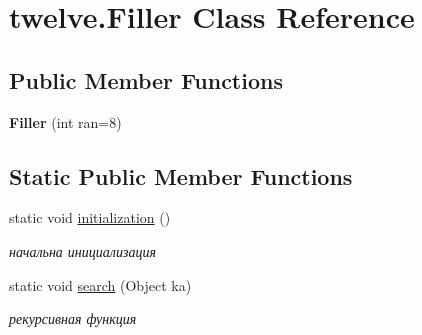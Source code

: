 \hypertarget{classtwelve_1_1_filler}{}\section{twelve.\+Filler Class Reference}
\label{classtwelve_1_1_filler}
\subsection*{Public Member Functions}
\begin{DoxyCompactItemize}
\item 
\hypertarget{classtwelve_1_1_filler_a64d6fd1ae798024fed8fa2e7c7eca9b6}{}{\bfseries Filler} (int ran=8)\label{classtwelve_1_1_filler_a64d6fd1ae798024fed8fa2e7c7eca9b6}

\end{DoxyCompactItemize}
\subsection*{Static Public Member Functions}
\begin{DoxyCompactItemize}
\item 
static void \hyperlink{classtwelve_1_1_filler_a8db08b243d23b903b84a3f2491010a74}{initialization} ()
\begin{DoxyCompactList}\small\item\em начальна инициализация \end{DoxyCompactList}\item 
static void \hyperlink{classtwelve_1_1_filler_a6de2c0a965775e0fec23e8b3468b6082}{search} (Object ka)
\begin{DoxyCompactList}\small\item\em рекурсивная функция \end{DoxyCompactList}\end{DoxyCompactItemize}
